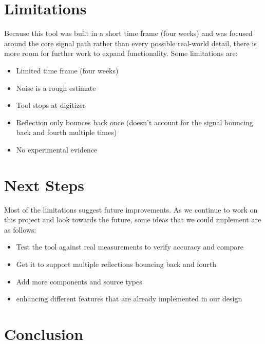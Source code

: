 \documentclass[10pt]{article}
\begin{document}
\section{Limitations}

Because this tool was built in a short time frame (four weeks) and was focused around the core signal path rather than every possible real-world detail, there is more room for further work to expand functionality.
Some limitations are:
\begin{itemize}
    \item Limited time frame (four weeks)
    \item Noise is a rough estimate
    \item Tool stops at digitizer 
    \item Reflection only bounces back once (doesn't account for the signal bouncing back and fourth multiple times)
    \item No experimental evidence
\end{itemize}
\section{Next Steps}

Most of the limitations suggest future improvements.
As we continue to work on this project and look towards the future, some ideas that we could implement are as follows:
\begin{itemize}
    \item Test the tool against real measurements to verify accuracy and compare
    \item Get it to support multiple reflections bouncing back and fourth
    \item Add more components and source types
    \item enhancing different features that are already implemented in our design
\end{itemize}
\section{Conclusion}
\end{document}
